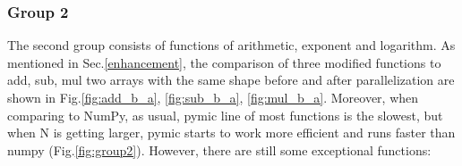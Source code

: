 \subsubsection{Group 2}
%
%
%
%
The second group consists of functions of arithmetic, exponent and logarithm. As mentioned in Sec.\ref{enhancement}, the comparison of three modified functions to add, sub, mul two arrays with the same shape before and after parallelization are shown in Fig.\ref{fig:add_b_a}, \ref{fig:sub_b_a}, \ref{fig:mul_b_a}. Moreover, when comparing to NumPy, as usual, pymic line of most functions is the slowest, but when N is getting larger, pymic starts to work more efficient and runs faster than numpy (Fig.\ref{fig:group2}). However, there are still some exceptional functions:

